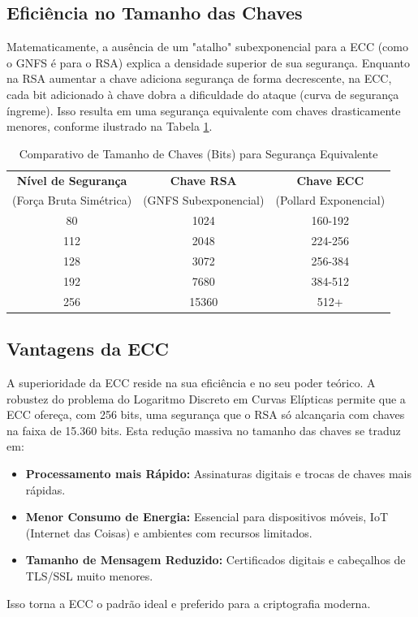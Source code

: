 \documentclass{article}
\theoremstyle{definicao_estilo}
\begin{document}
\subsection{Eficiência no Tamanho das Chaves}
Matematicamente, a ausência de um "atalho" subexponencial para a ECC (como o GNFS é para o RSA) explica a densidade superior de sua segurança. Enquanto na RSA aumentar a chave adiciona segurança de forma decrescente, na ECC, cada bit adicionado à chave dobra a dificuldade do ataque (curva de segurança íngreme). Isso resulta em uma segurança equivalente com chaves drasticamente menores, conforme ilustrado na Tabela \ref{tab:comparativo}.

\begin{table}[h]
\centering
\caption{Comparativo de Tamanho de Chaves (Bits) para Segurança Equivalente}
\vspace{0.3cm}
\begin{tabular}{ccc}
\toprule
\textbf{Nível de Segurança} & \textbf{Chave RSA} & \textbf{Chave ECC} \\
(Força Bruta Simétrica) & (GNFS Subexponencial) & (Pollard Exponencial) \\
\midrule
80 & 1024 & 160-192 \\
112 & 2048 & 224-256 \\
128 & 3072 & 256-384 \\
192 & 7680 & 384-512 \\
256 & 15360 & 512+ \\
\bottomrule
\end{tabular}
\label{tab:comparativo}
\end{table}

\subsection{Vantagens da ECC}
A superioridade da ECC reside na sua eficiência e no seu poder teórico. A robustez do problema do Logaritmo Discreto em Curvas Elípticas permite que a ECC ofereça, com 256 bits, uma segurança que o RSA só alcançaria com chaves na faixa de 15.360 bits. Esta redução massiva no tamanho das chaves se traduz em:
\begin{itemize}
\item \textbf{Processamento mais Rápido:} Assinaturas digitais e trocas de chaves mais rápidas.
\item \textbf{Menor Consumo de Energia:} Essencial para dispositivos móveis, IoT (Internet das Coisas) e ambientes com recursos limitados.
\item \textbf{Tamanho de Mensagem Reduzido:} Certificados digitais e cabeçalhos de TLS/SSL muito menores.
\end{itemize}
Isso torna a ECC o padrão ideal e preferido para a criptografia moderna.
\end{document}
